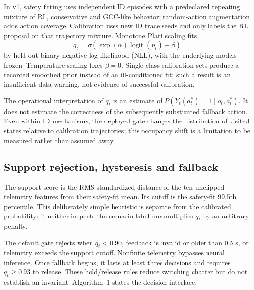 \documentclass[10pt]{article}
\begin{document}
In v1, safety fitting uses independent ID episodes with a predeclared repeating mixture of RL, conservative and GCC-like behavior; random-action augmentation adds action coverage. Calibration uses new ID trace seeds and only labels the RL proposal on that trajectory mixture. Monotone Platt scaling fits
\begin{equation}
q_t=\sigma\left(\exp(\alpha)\operatorname{logit}(p_t)+\beta\right)
\end{equation}
by held-out binary negative log likelihood (NLL), with the underlying models frozen. Temperature scaling fixes $\beta=0$. Single-class calibration sets produce a recorded smoothed prior instead of an ill-conditioned fit; such a result is an insufficient-data warning, not evidence of successful calibration.

The operational interpretation of $q_t$ is an estimate of $P(Y_t(a_t^*)=1\mid o_t,a_t^*)$. It does not estimate the correctness of the subsequently substituted fallback action. Even within ID mechanisms, the deployed gate changes the distribution of visited states relative to calibration trajectories; this occupancy shift is a limitation to be measured rather than assumed away.

\subsection{Support rejection, hysteresis and fallback}
The support score is the RMS standardized distance of the ten unclipped telemetry features from their safety-fit mean. Its cutoff is the safety-fit 99.5th percentile. This deliberately simple heuristic is separate from the calibrated probability: it neither inspects the scenario label nor multiplies $q_t$ by an arbitrary penalty.

The default gate rejects when $q_t<0.90$, feedback is invalid or older than 0.5 s, or telemetry exceeds the support cutoff. Nonfinite telemetry bypasses neural inference. Once fallback begins, it lasts at least three decisions and requires $q_t\geq0.93$ to release. These hold/release rules reduce switching chatter but do not establish an invariant. Algorithm~1 states the decision interface.
\end{document}
